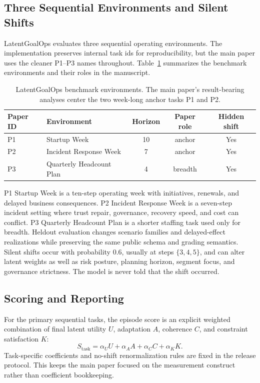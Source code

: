 \documentclass{article}
\begin{document}
\subsection{Three Sequential Environments and Silent Shifts}

LatentGoalOps evaluates three sequential operating environments. The
implementation preserves internal task ids for reproducibility, but the main
paper uses the cleaner P1--P3 names throughout. Table~\ref{tab:tasksuite}
summarizes the benchmark environments and their roles in the manuscript.

\begin{table}[t]
  \centering
  \scriptsize
  \setlength{\tabcolsep}{4pt}
  \begin{tabular}{l l c c c}
    \toprule
    Paper ID & Environment & Horizon & Paper role & Hidden shift \\
    \midrule
    P1 & Startup Week & 10 & anchor & Yes \\
    P2 & Incident Response Week & 7 & anchor & Yes \\
    P3 & Quarterly Headcount Plan & 4 & breadth & Yes \\
    \bottomrule
  \end{tabular}
  \caption{LatentGoalOps benchmark environments. The main paper's
  result-bearing analyses center the two week-long anchor tasks P1 and P2.}
  \label{tab:tasksuite}
\end{table}

P1 Startup Week is a ten-step operating week with initiatives, renewals, and
delayed business consequences. P2 Incident Response Week is a seven-step
incident setting where trust repair, governance, recovery speed, and cost can
conflict. P3 Quarterly Headcount Plan is a shorter staffing task used only for
breadth. Heldout evaluation changes scenario families and delayed-effect
realizations while preserving the same public schema and grading semantics.
Silent shifts occur with probability $0.6$, usually at steps $\{3,4,5\}$, and
can alter latent weights as well as risk posture, planning horizon, segment
focus, and governance strictness. The model is never told that the shift
occurred.

\subsection{Scoring and Reporting}

For the primary sequential tasks, the episode score is an explicit weighted
combination of final latent utility $U$, adaptation $A$, coherence $C$, and
constraint satisfaction $K$:
\[
S_{\mathrm{task}} = \alpha_U U + \alpha_A A + \alpha_C C + \alpha_K K.
\]
Task-specific coefficients and no-shift renormalization rules are fixed in the
release protocol. This keeps the main paper focused on
the measurement construct rather than coefficient bookkeeping.
\end{document}
